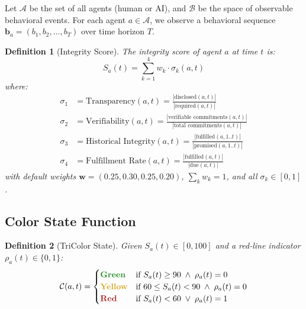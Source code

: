\documentclass[conference]{IEEEtran}
\newtheorem{definition}{Definition}
\begin{document}
Let $\mathcal{A}$ be the set of all agents (human or AI),
and $\mathcal{B}$ be the space of observable behavioral events.
For each agent $a \in \mathcal{A}$, we observe a behavioral
sequence $\mathbf{b}_a = (b_1, b_2, \ldots, b_T)$ over time horizon
$T$.

\begin{definition}[Integrity Score]
The \emph{integrity score} of agent $a$ at time $t$ is:
\begin{equation}
  S_a(t) = \sum_{k=1}^{4} w_k \cdot \sigma_k(a, t)
  \label{eq:integrity_score}
\end{equation}
where:
\begin{align*}
  \sigma_1 &= \text{Transparency}(a,t)
    = \frac{|\text{disclosed}(a,t)|}{|\text{required}(a,t)|} \\
  \sigma_2 &= \text{Verifiability}(a,t)
    = \frac{|\text{verifiable commitments}(a,t)|}{|\text{total commitments}(a,t)|} \\
  \sigma_3 &= \text{Historical Integrity}(a,t)
    = \frac{|\text{fulfilled}(a,1..t)|}{|\text{promised}(a,1..t)|} \\
  \sigma_4 &= \text{Fulfillment Rate}(a,t)
    = \frac{|\text{fulfilled}(a,t)|}{|\text{due}(a,t)|}
\end{align*}
with default weights $\mathbf{w} = (0.25, 0.30, 0.25, 0.20)$,
$\sum_k w_k = 1$, and all $\sigma_k \in [0,1]$.
\end{definition}

\subsection{Color State Function}

\begin{definition}[TriColor State]
Given $S_a(t) \in [0,100]$ and a red-line indicator
$\rho_a(t) \in \{0,1\}$:
\begin{equation}
  \mathcal{C}(a,t) =
  \begin{cases}
    \textcolor{greenTrust}{\mathbf{Green}} &
    \text{if } S_a(t) \geq 90 \;\wedge\; \rho_a(t) = 0 \\
    \textcolor{yellowWarn}{\mathbf{Yellow}} &
    \text{if } 60 \leq S_a(t) < 90 \;\wedge\; \rho_a(t) = 0 \\
    \textcolor{redBreak}{\mathbf{Red}} &
    \text{if } S_a(t) < 60 \;\vee\; \rho_a(t) = 1
  \end{cases}
  \label{eq:color_state}
\end{equation}
\end{definition}
\end{document}
